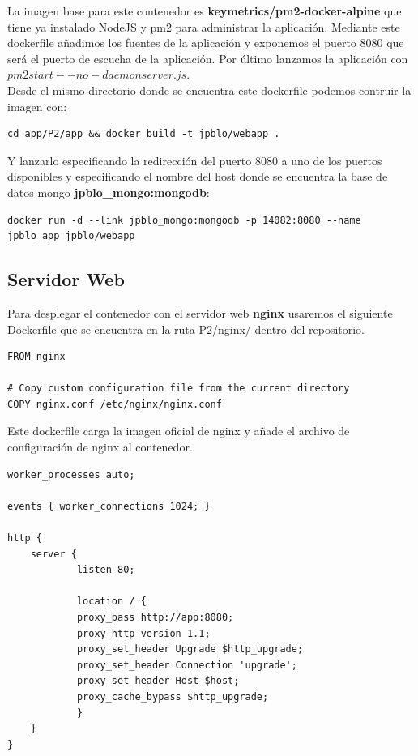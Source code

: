 La imagen base para este contenedor es \textbf{keymetrics/pm2-docker-alpine} que tiene ya instalado NodeJS y pm2 para administrar la aplicación. Mediante este dockerfile añadimos los fuentes de la aplicación y exponemos el puerto 8080 que será el puerto de escucha de la aplicación. Por último lanzamos la aplicación con $pm2 start --no-daemon server.js$. \\

Desde el mismo directorio donde se encuentra este dockerfile podemos contruir la imagen con: \\

\begin{lstlisting}
cd app/P2/app && docker build -t jpblo/webapp .
\end{lstlisting}

Y lanzarlo especificando la redirección del puerto 8080 a uno de los puertos disponibles y especificando el nombre del host donde se encuentra la base de datos mongo \textbf{jpblo\_mongo:mongodb}: \\

\begin{lstlisting}
docker run -d --link jpblo_mongo:mongodb -p 14082:8080 --name jpblo_app jpblo/webapp
\end{lstlisting}

\subsection{Servidor Web}

Para desplegar el contenedor con el servidor web \textbf{nginx} usaremos el siguiente Dockerfile que se encuentra en la ruta P2/nginx/ dentro del repositorio. \\

\begin{lstlisting}
FROM nginx

# Copy custom configuration file from the current directory
COPY nginx.conf /etc/nginx/nginx.conf
\end{lstlisting}

Este dockerfile carga la imagen oficial de nginx y añade el archivo de configuración de nginx al contenedor. \\

\begin{lstlisting}
worker_processes auto;

events { worker_connections 1024; }

http {
	server {
			listen 80;
		
			location / {
			proxy_pass http://app:8080;
			proxy_http_version 1.1;
			proxy_set_header Upgrade $http_upgrade;
			proxy_set_header Connection 'upgrade';
			proxy_set_header Host $host;
			proxy_cache_bypass $http_upgrade;
			}
	}
}
\end{lstlisting}

